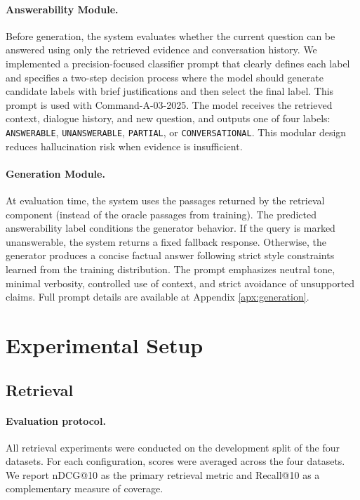\documentclass[11pt]{article}
\begin{document}
\paragraph{Answerability Module.}

Before generation, the system evaluates whether the current question can be answered using only the retrieved evidence and conversation history. We implemented a precision-focused classifier prompt that clearly defines each label and specifies a two-step decision process where the model should generate candidate labels with brief justifications and then select the final label. This prompt is used with Command-A-03-2025. The model receives the retrieved context, dialogue history, and new question, and outputs one of four labels: \texttt{ANSWERABLE}, \texttt{UNANSWERABLE}, \texttt{PARTIAL}, or \texttt{CONVERSATIONAL}. This modular design reduces hallucination risk when evidence is insufficient.

\paragraph{Generation Module.}

At evaluation time, the system uses the passages returned by the retrieval component (instead of the oracle passages from training). The predicted answerability label conditions the generator behavior. If the query is marked unanswerable, the system returns a fixed fallback response. Otherwise, the generator produces a concise factual answer following strict style constraints learned from the training distribution. The prompt emphasizes neutral tone, minimal verbosity, controlled use of context, and strict avoidance of unsupported claims. Full prompt details are available at Appendix \ref{apx:generation}.

\section{Experimental Setup}

\subsection{Retrieval}

\paragraph{Evaluation protocol.}
All retrieval experiments were conducted on the development split of the four datasets. For each configuration, scores were averaged across the four datasets. We report nDCG@10 as the primary retrieval metric and Recall@10 as a complementary measure of coverage.
\end{document}
